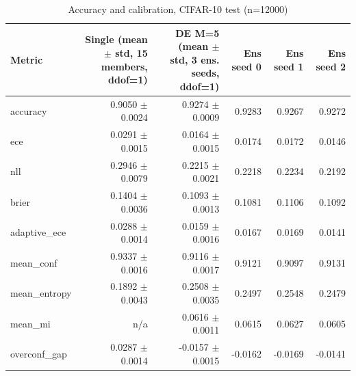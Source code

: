 \begin{table}
\centering
\caption{Accuracy and calibration, CIFAR-10 test (n=12000)}
\label{tab:de_main_metrics}
\begin{tabular}{lrrrrr}
\toprule
      Metric & Single (mean $\pm$ std, 15 members, ddof=1) & DE M=5 (mean $\pm$ std, 3 ens. seeds, ddof=1) & Ens seed 0 & Ens seed 1 & Ens seed 2 \\
\midrule
    accuracy &                         0.9050 $\pm$ 0.0024 &                           0.9274 $\pm$ 0.0009 &     0.9283 &     0.9267 &     0.9272 \\
         ece &                         0.0291 $\pm$ 0.0015 &                           0.0164 $\pm$ 0.0015 &     0.0174 &     0.0172 &     0.0146 \\
         nll &                         0.2946 $\pm$ 0.0079 &                           0.2215 $\pm$ 0.0021 &     0.2218 &     0.2234 &     0.2192 \\
       brier &                         0.1404 $\pm$ 0.0036 &                           0.1093 $\pm$ 0.0013 &     0.1081 &     0.1106 &     0.1092 \\
adaptive\_ece &                         0.0288 $\pm$ 0.0014 &                           0.0159 $\pm$ 0.0016 &     0.0167 &     0.0169 &     0.0141 \\
   mean\_conf &                         0.9337 $\pm$ 0.0016 &                           0.9116 $\pm$ 0.0017 &     0.9121 &     0.9097 &     0.9131 \\
mean\_entropy &                         0.1892 $\pm$ 0.0043 &                           0.2508 $\pm$ 0.0035 &     0.2497 &     0.2548 &     0.2479 \\
     mean\_mi &                                     n/a &                           0.0616 $\pm$ 0.0011 &     0.0615 &     0.0627 &     0.0605 \\
overconf\_gap &                         0.0287 $\pm$ 0.0014 &                          -0.0157 $\pm$ 0.0015 &    -0.0162 &    -0.0169 &    -0.0141 \\
\bottomrule
\end{tabular}
\end{table}
